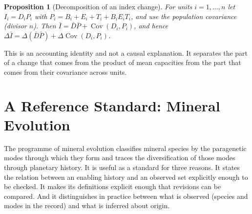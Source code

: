 \documentclass[11pt]{article}
\newtheorem{proposition}{Proposition}
\theoremstyle{definition}
\theoremstyle{remark}
\begin{document}
\begin{proposition}[Decomposition of an index change]\label{prop:decomp}
For units $i=1,\dots,n$ let $I_i=D_iP_i$ with $P_i=B_i+E_i+T_i+B_iE_iT_i$, and use the population covariance (divisor $n$). Then $\bar I=\bar D\bar P+\operatorname{Cov}(D_i,P_i)$, and hence $\Delta\bar I=\Delta(\bar D\bar P)+\Delta\operatorname{Cov}(D_i,P_i)$.
\end{proposition}

This is an accounting identity and not a causal explanation. It separates the part of a change that comes from the product of mean capacities from the part that comes from their covariance across units.

\section{A Reference Standard: Mineral Evolution}

The programme of mineral evolution \cite{hazen2008,hazen2010} classifies mineral species by the paragenetic modes through which they form and traces the diversification of those modes through planetary history. It is useful as a standard for three reasons. It states the relation between an enabling history and an observed set explicitly enough to be checked. It makes its definitions explicit enough that revisions can be compared. And it distinguishes in practice between what is observed (species and modes in the record) and what is inferred about origin.
\end{document}
